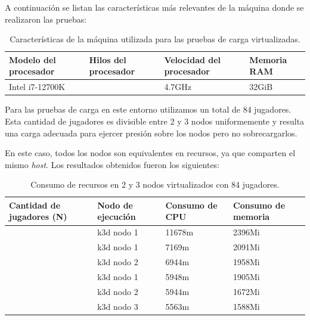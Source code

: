 A continuación se listan las características más relevantes de la máquina donde se realizaron las pruebas:

\begin{table}[h]
\centering
\begin{tabularx}{\textwidth} { 
    | >{\centering\arraybackslash}X 
    | >{\centering\arraybackslash}X 
    | >{\centering\arraybackslash}X 
    | >{\centering\arraybackslash}X | }
    \hline
    \textbf{Modelo del procesador} & \textbf{Hilos del procesador} & \textbf{Velocidad del procesador} & \textbf{Memoria RAM} \\
    \hline
    Intel i7-12700K & 20 & 4.7GHz & 32GiB \\
    \hline
\end{tabularx}
\caption{Características de la máquina utilizada para las pruebas de carga virtualizadas.}
\end{table}

Para las pruebas de carga en este entorno utilizamos un total de 84 jugadores. Esta cantidad de jugadores es divisible entre 2 y 3 nodos
uniformemente y resulta una carga adecuada para ejercer presión sobre los nodos pero no sobrecargarlos.

En este caso, todos los nodos son equivalentes en recursos, ya que comparten el mismo \textit{host}. Los resultados obtenidos fueron los siguientes:

\begin{table}[h]
\centering
\begin{tabularx}{\textwidth} { 
    | >{\centering\arraybackslash}X 
    | >{\centering\arraybackslash}X 
    | >{\centering\arraybackslash}X 
    | >{\centering\arraybackslash}X | }
        \hline
        \textbf{Cantidad de jugadores (N)} & \textbf{Nodo de ejecución} & \textbf{Consumo de CPU} & \textbf{Consumo de memoria} \\
        \hline
        84 & k3d nodo 1 & 11678m & 2396Mi \\
        \hline
        \multirow{2}{*}{84} & k3d nodo 1 & 7169m & 2091Mi \\
        \cline{2-4}
        & k3d nodo 2 & 6944m & 1958Mi \\
        \hline
        \multirow{3}{*}{84} & k3d nodo 1 & 5948m & 1905Mi \\
        \cline{2-4}
        & k3d nodo 2 & 5944m & 1672Mi \\
        \cline{2-4}
        & k3d nodo 3 & 5563m & 1588Mi \\
        \hline
\end{tabularx}
\caption{Consumo de recursos en 2 y 3 nodos virtualizados con 84 jugadores.}
\label{tab:virtualization-results}
\end{table}

